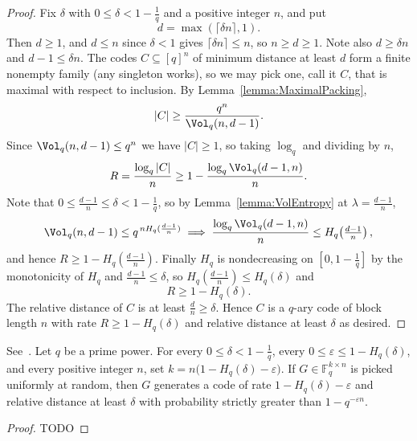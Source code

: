 \begin{proof}
    \leanok
    Fix $\delta$ with $0 \leq \delta < 1 - \frac{1}{q}$ and a positive integer $n$, and put
    \[
      d = \max(\lceil \delta n \rceil, 1).
    \]
    Then $d \geq 1$, and $d \leq n$ since $\delta < 1$ gives $\lceil \delta n \rceil \leq n$, so $n \geq d \geq 1$. Note also $d \geq \delta n$ and $d - 1 \leq \delta n$.
    The codes $C \subseteq [q]^{n}$ of minimum distance at least $d$ form a finite nonempty family (any singleton works), so we may pick one, call it $C$, that is maximal with respect to inclusion.
    By Lemma~\ref{lemma:MaximalPacking},
    \[
      |C| \geq \frac{q^{n}}{\Vol_{q}(n,d-1)}.
    \]
    Since $\Vol_{q}(n,d-1) \leq q^{n}$ we have $|C| \geq 1$, so taking $\log_{q}$ and dividing by $n$,
    \[
      R = \frac{\log_{q}|C|}{n} \geq 1 - \frac{\log_{q}\Vol_{q}(d-1,n)}{n}.
    \]
    Note that $0 \leq \frac{d-1}{n} \leq \delta < 1 - \frac{1}{q}$, so by Lemma~\ref{lemma:VolEntropy} at $\lambda = \frac{d-1}{n}$,
    \[
      \Vol_{q}(n,d-1) \leq q^{\,n H_q(\frac{d-1}{n})} \implies \frac{\log_{q}\Vol_{q}(d-1,n)}{n} \leq H_q\!\left(\tfrac{d-1}{n}\right),
    \]
    and hence $R \geq 1 - H_q(\frac{d-1}{n})$. Finally $H_q$ is nondecreasing on $[0, 1 - \frac{1}{q}]$ by the monotonicity of $H_q$ and $\frac{d-1}{n} \leq \delta$, so $H_q(\frac{d-1}{n}) \leq H_q(\delta)$ and
    \[
      R \geq 1 - H_q(\delta).
    \]
    The relative distance of $C$ is at least $\frac{d}{n} \geq \delta$.
    Hence $C$ is a $q$-ary code of block length $n$ with rate $R \geq 1 - H_q(\delta)$ and relative distance at least $\delta$ as desired.
\end{proof}

\begin{theorem}
See~\cite{GRS}.
Let $q$ be a prime power.
For every $0 \leq \delta < 1 - \frac{1}{q}$, every $0 \leq \varepsilon \leq 1 - H_q(\delta)$, and every positive integer $n$, set $k = n\bigl(1 - H_q(\delta) - \varepsilon\bigr)$.
If $G \in \mathbb{F}^{k \times n}_{q}$ is picked uniformly at random, then $G$ generates a code of rate $1 - H_q(\delta) - \varepsilon$ and relative distance at least $\delta$ with probability strictly greater than $1 - q^{-\varepsilon n}$.
\end{theorem}

\begin{proof}
    TODO
\end{proof}


